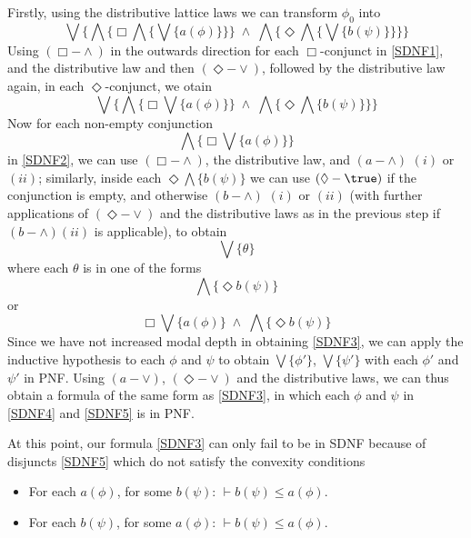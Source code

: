 Firstly, using the distributive lattice laws we can transform $\phi_{0}$ into
\begin{equation}  
\label{SDNF1}
\bigvee \{ \bigwedge \{ \Box \bigwedge \{ \bigvee \{ a(\phi ) \} \} \} \; \wedge \; \bigwedge \{ \Diamond \bigwedge \{ \bigvee \{ b(\psi ) \} \} \} \}
\end{equation}
Using $({\Box}-{\wedge})$ in the outwards direction for each $\Box$-conjunct in \ref{SDNF1}, and the distributive law and then $({\Diamond}-{\vee})$, followed by the distributive law again, in each $\Diamond$-conjunct, we otain
\begin{equation} 
\label{SDNF2}
\bigvee \{ \bigwedge \{ \Box \bigvee \{ a(\phi ) \} \} \; \wedge \; \bigwedge \{ \Diamond \bigwedge \{ b(\psi ) \} \} \}
\end{equation}
Now for each non-empty conjunction
\[ \bigwedge \{ \Box \bigvee \{ a(\phi ) \} \} \]
in \ref{SDNF2}, we can use $({\Box}-{\wedge})$, the distributive law, and $(a-{\wedge})$ $(i)$ or $(ii)$; similarly, inside each $\Diamond \bigwedge \{ b(\psi ) \}$ we can use $({\Diamond}-{\true})$ if the conjunction is empty, and otherwise $(b-{\wedge})$ $(i)$ or $(ii)$ (with further applications of $({\Diamond}-{\vee})$ and the distributive laws as in the previous step if $(b-{\wedge})(ii)$ is applicable), to obtain
\begin{equation} 
\label{SDNF3}
\bigvee \{ \theta \}
\end{equation}
where each $\theta$ is in one of the forms
\begin{equation} 
\label{SDNF4}
\bigwedge \{ \Diamond b(\psi ) \}
\end{equation}
or
\begin{equation} 
\label{SDNF5}
\Box \bigvee \{ a(\phi ) \} \; \wedge \; \bigwedge \{ \Diamond b(\psi ) \}
\end{equation}
Since we have not increased modal depth in obtaining \ref{SDNF3}, we can apply the inductive hypothesis to each $\phi$ and $\psi$ to obtain $\bigvee \{ \phi' \}$, $\bigvee \{ \psi' \}$ with each $\phi'$ and $\psi'$ in PNF.
Using  $(a-{\vee})$, $({\Diamond}-{\vee})$ and the distributive laws, we can thus obtain a formula of the same form as \ref{SDNF3}, in which each $\phi$ and $\psi$ in \ref{SDNF4} and \ref{SDNF5} is in PNF.

At this point, our formula \ref{SDNF3} can only fail to be in SDNF because of disjuncts \ref{SDNF5} which do not satisfy the convexity conditions
\begin{itemize}
\item For each $a(\phi )$, for some $b(\psi )$: $\vdash  b(\psi ) \leq a(\phi )$.
\item For each $b(\psi )$, for some $a(\phi )$: $\vdash   b(\psi ) \leq a(\phi )$.
\end{itemize}

